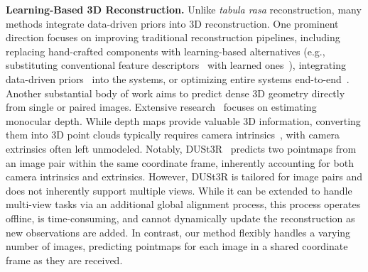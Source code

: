 \vspace{0.5em}\noindent\textbf{Learning-Based 3D Reconstruction.} 
Unlike \textit{tabula rasa} reconstruction, many methods integrate data-driven priors into 3D reconstruction. One prominent direction focuses on improving traditional reconstruction pipelines, including replacing hand-crafted components with learning-based alternatives (e.g., substituting conventional feature descriptors~\cite{lowe2004distinctive,bay2008speeded} with learned ones~\cite{sarlin20superglue,detone2018superpoint,sun2021loftr,dusmanu2019d2}), integrating data-driven priors~\cite{teed2021droid,chen2024leap,teed2024deep,yu2024mip,yang2020d3vo,zhu2024nicer,tateno2017cnn} into the systems, or optimizing entire systems end-to-end~\cite{wang2024vggsfm,teed2021droid,tang2018ba,yao2018mvsnet}.
Another substantial body of work aims to predict dense 3D geometry directly from single or paired images.
Extensive research~\cite{li2018megadepth,yang2024depth,godard2019digging,bhat2023zoedepth,wang2024moge,piccinelli2024unidepth,Ranftl2022,Ranftl2021} focuses on estimating monocular depth. While depth maps provide valuable 3D information, converting them into 3D point clouds typically requires camera intrinsics~\cite{piccinelli2024unidepth,hu2024metric3d,depthpro}, with camera extrinsics often left unmodeled.
Notably, DUSt3R~\cite{wang2024dust3r} predicts two pointmaps from an image pair within the same coordinate frame, inherently accounting for both camera intrinsics and extrinsics. However,  DUSt3R is tailored for image pairs and does not inherently support multiple views. While it can be extended to handle multi-view tasks via an additional global alignment process, this process operates offline, is time-consuming, and cannot dynamically update the reconstruction as new observations are added. 
In contrast, our method flexibly handles a varying number of images, predicting pointmaps for each image in a shared coordinate frame as they are received.

